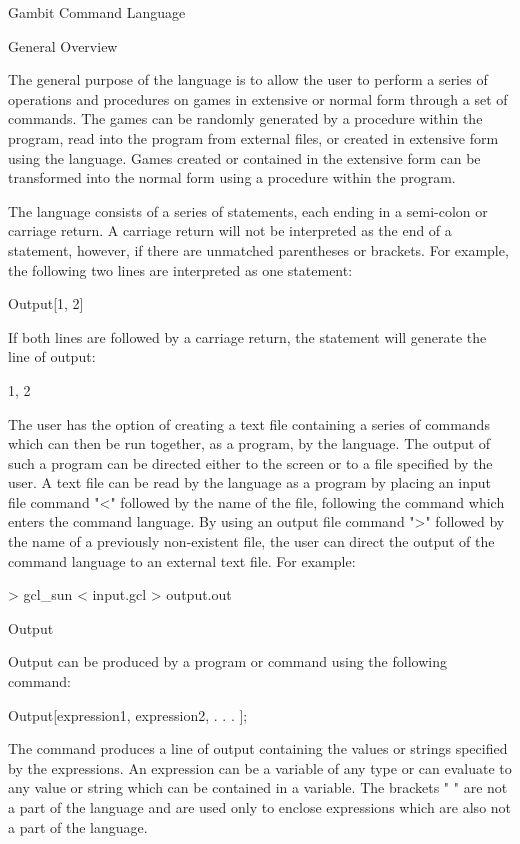 Gambit Command Language


General Overview

The general purpose of the language is to allow the user to perform a series of
operations and procedures on games in extensive or normal form through a set of
commands.  The games can be randomly generated by a procedure within the
program, read into the program from external files, or created in extensive
form using the language.  Games created or contained in the extensive form can
be transformed into the normal form using a procedure within the program.

The language consists of a series of statements, each ending in a semi-colon
or carriage return.  A carriage return will not be interpreted as the end of a
statement, however, if there are unmatched parentheses or brackets.  For
example, the following two lines are interpreted as one statement:

	Output[1,
	2]

If both lines are followed by a carriage return, the statement will generate
the line of output: 

	1, 2

The user has the option of creating a text file containing a series of commands
which can then be run together, as a program, by the language.  The output of 
such a program can be directed either to the screen or to a file specified by 
the user.  A text file can be read by the language as a program by placing an 
input file command "<" followed by the name of the file, following the command 
which enters the command language.  By using an output file command ">" 
followed by the name of a previously non-existent file, the user can direct the
output of the command language to an external text file.  For example:

	> gcl_sun < input.gcl > output.out


Output

Output can be produced by a program or command using the following command:

	Output[{expression1}, {expression2}, . . . ];

The command produces a line of output containing the values or strings 
specified by the expressions.  An expression can be a variable of any type or 
can evaluate to any value or string which can be contained in a variable.  The 
brackets "{ }" are not a part of the language and are used only to enclose
expressions which are also not a part of the language.


